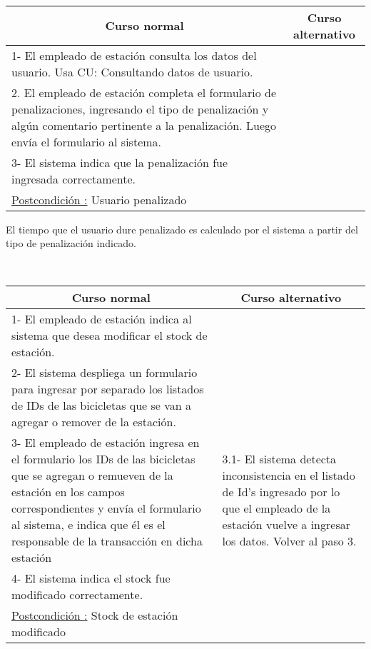 ~

\begin{center}
    \centering
    \begin{tabular}{ | p{11cm} | p{6cm} | }
    	\multicolumn{1}{c}{\cellcolor{black!30}\textbf{Curso normal}} & 
    	\multicolumn{1}{c}{\cellcolor{black!30}\textbf{Curso alternativo}} \\
		\hline
		1- El empleado de estación consulta los datos del usuario. Usa CU: Consultando datos de usuario. &  \\ \hline
		2. El empleado de estación completa el formulario de penalizaciones, ingresando el tipo de penalización y algún comentario pertinente a la penalización. Luego envía el formulario al sistema. & \\ \hline
		3- El sistema indica que la penalización fue ingresada correctamente. & \\ \hline
		\underline{Postcondición :} Usuario penalizado & \\ \hline
    \end{tabular}
\end{center}

El tiempo que el usuario dure penalizado es calculado por el sistema a partir del tipo de penalización indicado.

~

\begin{center}
    \centering
    \begin{tabular}{ | p{11cm} | p{6cm} | }
    	\multicolumn{1}{c}{\cellcolor{black!30}\textbf{Curso normal}} & 
    	\multicolumn{1}{c}{\cellcolor{black!30}\textbf{Curso alternativo}} \\
		\hline
		1- El empleado de estación indica al sistema que desea modificar el stock de estación. & \\ \hline
		2- El sistema despliega un formulario para ingresar por separado los listados de IDs de las bicicletas que se van a agregar o remover de la estación. & \\ \hline
		3- El empleado de estación ingresa en el formulario los IDs de las bicicletas que se agregan o remueven de la estación en los campos correspondientes y envía el formulario al sistema, e indica que él es el responsable de la
		transacción en dicha estación & 
		3.1- El sistema detecta inconsistencia en el listado de Id's ingresado por lo que el empleado de la estación vuelve a ingresar los datos. Volver al paso 3.\\ \hline
		4- El sistema indica el stock fue modificado correctamente. & \\ \hline
		\underline{Postcondición :} Stock de estación modificado & \\ \hline
    \end{tabular}
\end{center}	

